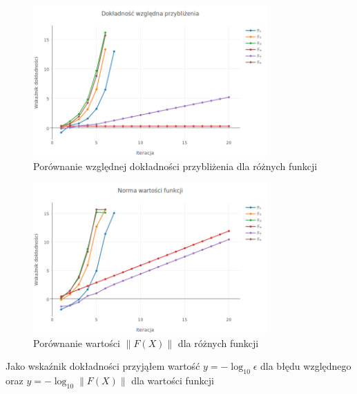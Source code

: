 \documentclass[11pt,wide]{mwart}
\begin{document}
\begin{figure}[p]
    \centering
    \includegraphics[width=0.8\textwidth]{rel_precision}
    \caption{Porównanie względnej dokładności przybliżenia dla różnych funkcji}
    \label{fig:relprecision}
\end{figure}
\begin{figure}[p]
    \centering
    \includegraphics[width=0.8\textwidth]{norm}
    \caption{Porównanie wartości $ \| F(X) \| $ dla różnych funkcji}
    \label{fig:norm}
\end{figure}
Jako wskaźnik dokładności przyjąłem wartość $ y = -\log_{10}\epsilon $ dla błędu względnego oraz $ y = -\log_{10}\|F(X)\| $ dla wartości funkcji
\FloatBarrier
\end{document}
